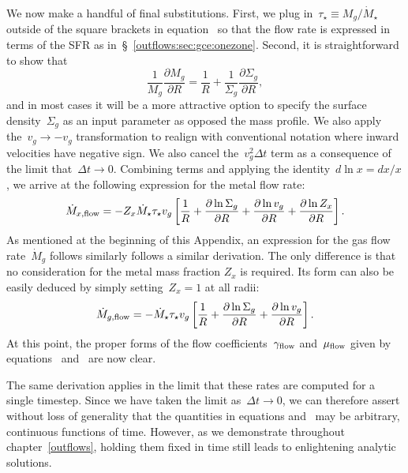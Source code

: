 \documentclass[main.tex]{subfiles}
\begin{document}
\par
We now make a handful of final substitutions.
First, we plug in~$\tau_\star \equiv M_g / \dot{M}_\star$ outside of the square
brackets in equation~ so that the flow rate
is expressed in terms of the SFR as in~\S~\ref{outflows:sec:gce:onezone}.
Second, it is straightforward to show that
\begin{equation}
\frac{1}{M_g} \frac{\partial M_g}{\partial R} =
\frac{1}{R} + \frac{1}{\Sigma_g} \frac{\partial \Sigma_g}{\partial R},
\end{equation}
and in most cases it will be a more attractive option to specify the surface
density~$\Sigma_g$ as an input parameter as opposed the mass profile.
We also apply the~$v_g \rightarrow -v_g$ transformation to realign with
conventional notation where inward velocities have negative sign.
We also cancel the~$v_g^2 \Delta t$ term as a consequence of the limit
that~$\Delta t \rightarrow 0$.
Combining terms and applying the identity~$d \ln x = dx / x$, we arrive at the
following expression for the metal flow rate:
\begin{equation}
\dot{M}_{x,\text{flow}} = -Z_x \dot{M}_\star \tau_\star v_g
\left[
\frac{1}{R} +
\frac{\partial \ln \Sigma_g}{\partial R} +
\frac{\partial \ln v_g}{\partial R} +
\frac{\partial \ln Z_x}{\partial R}
\right].
\label{outflows:eq:mdot-element-result}
\end{equation}
As mentioned at the beginning of this Appendix, an expression for the gas flow
rate~$\dot{M}_g$ follows similarly follows a similar derivation.
The only difference is that no consideration for the metal mass fraction
$Z_x$ is required.
Its form can also be easily deduced by simply setting~$Z_x = 1$ at all radii:
\begin{equation}
\dot{M}_{g,\text{flow}} = -\dot{M}_\star \tau_\star v_g \left[
\frac{1}{R} +
\frac{\partial \ln \Sigma_g}{\partial R} +
\frac{\partial \ln v_g}{\partial R}
\right].
\label{outflows:eq:mdot-gas-result}
\end{equation}
At this point, the proper forms of the flow coefficients~$\gamma_{\text{flow}}$
and~$\mu_{\text{flow}}$ given by equations~
and~ are now clear.
\par
The same derivation applies in the limit that these rates are computed for a
single timestep.
Since we have taken the limit as~$\Delta t \rightarrow 0$, we can therefore
assert without loss of generality that the quantities in equations
 and~
may be arbitrary, continuous functions of time.
However, as we demonstrate throughout chapter~\ref{outflows}, holding them
fixed in time still leads to enlightening analytic solutions.
\end{document}
